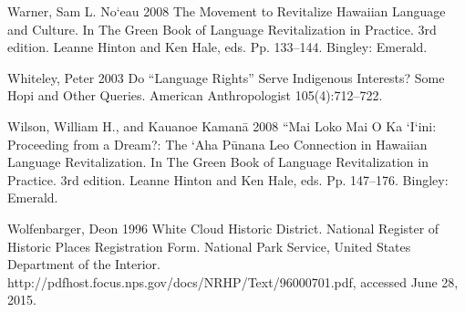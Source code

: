\documentclass[output=paper]{LSP/langsci}
\begin{document}
\begin{reflist}
Warner, Sam L. No`eau 2008 The Movement to Revitalize Hawaiian Language and Culture. In The Green Book of Language Revitalization in Practice. 3rd edition. Leanne Hinton and Ken Hale, eds. Pp. 133--144. Bingley: Emerald.

Whiteley, Peter 2003 Do ``Language Rights'' Serve Indigenous Interests? Some Hopi and Other Queries. American Anthropologist 105(4):712--722.

Wilson, William H., and Kauanoe Kaman\=a 2008 ``Mai Loko Mai O Ka `I`ini: Proceeding from a Dream?: The `Aha P\=unana Leo Connection in Hawaiian Language Revitalization. In The Green Book of Language Revitalization in Practice. 3rd edition. Leanne Hinton and Ken Hale, eds. Pp. 147--176. Bingley: Emerald.

Wolfenbarger, Deon 1996 White Cloud Historic District. National Register of Historic Places Registration Form. National Park Service, United States Department of the Interior. http://pdfhost.focus.nps.gov/docs/NRHP/Text/96000701.pdf, accessed June 28, 2015.

\end{reflist}
\end{document}
